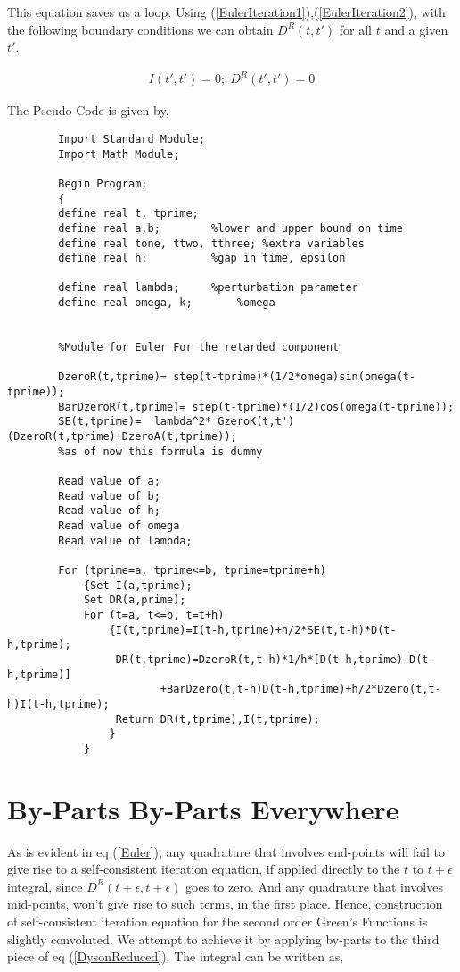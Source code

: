 \documentclass{amsart}
\begin{document}
    This equation saves us a loop. Using (\ref{EulerIteration1}),(\ref{EulerIteration2}), with the following boundary conditions we can obtain $D^R(t,t')$ for all $t$ and a given $t'$.
    
    \begin{align}\label{BoundaryCondition1}
        I(t',t')=0; \; D^R(t',t')=0
    \end{align}

    The Pseudo Code is given by,
    
    \begin{verbatim}
        Import Standard Module;
        Import Math Module;
        
        Begin Program;
        {
        define real t, tprime;
        define real a,b; 		%lower and upper bound on time
        define real tone, ttwo, tthree;	%extra variables
        define real h;			%gap in time, epsilon
        
        define real lambda;		%perturbation parameter
        define real omega, k;		%omega
        
        
        %Module for Euler For the retarded component
        
        DzeroR(t,tprime)= step(t-tprime)*(1/2*omega)sin(omega(t-tprime));
        BarDzeroR(t,tprime)= step(t-tprime)*(1/2)cos(omega(t-tprime));
        SE(t,tprime)=  lambda^2* GzeroK(t,t')(DzeroR(t,tprime)+DzeroA(t,tprime));
        %as of now this formula is dummy
        
        Read value of a;
        Read value of b;
        Read value of h;
        Read value of omega
        Read value of lambda;
        
        For (tprime=a, tprime<=b, tprime=tprime+h)
        	{Set I(a,tprime);
        	Set DR(a,prime);
        	For (t=a, t<=b, t=t+h)
        		{I(t,tprime)=I(t-h,tprime)+h/2*SE(t,t-h)*D(t-h,tprime);
        		 DR(t,tprime)=DzeroR(t,t-h)*1/h*[D(t-h,tprime)-D(t-h,tprime)]
        		        +BarDzero(t,t-h)D(t-h,tprime)+h/2*Dzero(t,t-h)I(t-h,tprime); 
        		 Return DR(t,tprime),I(t,tprime);
        		}
        	}
    \end{verbatim}
    
\section{By-Parts By-Parts Everywhere}

     As is evident in eq (\ref{Euler}), any quadrature that involves end-points will fail to give rise to a self-consistent iteration equation, if applied directly to the $t$ to $t+\epsilon$ integral, since $D^R(t+\epsilon,t+\epsilon)$ goes to zero. And any quadrature that involves mid-points, won't give rise to such terms, in the first place. Hence, construction of self-consistent iteration equation for the second order Green's Functions is slightly convoluted. We attempt to achieve it by applying by-parts to the third piece of eq (\ref{DysonReduced}). The integral can be written as,
     
\end{document}
